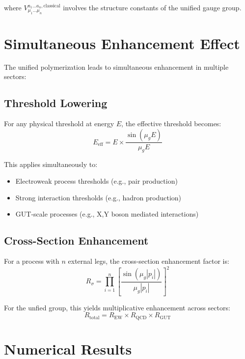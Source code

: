 \documentclass[11pt]{article}
\begin{document}
where $V^{a_1\ldots a_n,\text{classical}}_{\mu_1\ldots\mu_n}$ involves the structure constants of the unified gauge group.

\section{Simultaneous Enhancement Effect}

The unified polymerization leads to simultaneous enhancement in multiple sectors:

\subsection{Threshold Lowering}
For any physical threshold at energy $E$, the effective threshold becomes:
\begin{equation}
E_{\text{eff}} = E \times \frac{\sin(\mu_g E)}{\mu_g E}
\end{equation}

This applies simultaneously to:
\begin{itemize}
    \item Electroweak process thresholds (e.g., pair production)
    \item Strong interaction thresholds (e.g., hadron production)
    \item GUT-scale processes (e.g., X,Y boson mediated interactions)
\end{itemize}

\subsection{Cross-Section Enhancement}
For a process with $n$ external legs, the cross-section enhancement factor is:
\begin{equation}
R_{\sigma} = \prod_{i=1}^{n} \left[\frac{\sin(\mu_g |p_i|)}{\mu_g |p_i|}\right]^2
\end{equation}

For the unfied group, this yields multiplicative enhancement across sectors:
\begin{equation}
R_{\text{total}} = R_{\text{EW}} \times R_{\text{QCD}} \times R_{\text{GUT}}
\end{equation}

\section{Numerical Results}
\end{document}
